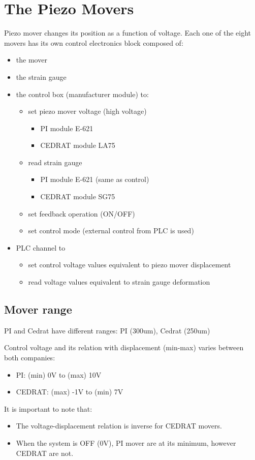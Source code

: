 \section{The Piezo Movers}
Piezo mover changes its position as a function of voltage. Each one of the eight movers has its own control electronics block composed of: 
\begin{itemize}
 \item the mover
\item the strain gauge
\item the control box (manufacturer module) to:
\begin{itemize}
 \item set piezo mover voltage (high voltage)
 \begin{itemize}
\item PI module E-621
\item CEDRAT module LA75
\end{itemize}
\item read strain gauge
\begin{itemize}
\item PI module E-621 (same as control)
\item CEDRAT module SG75
\end{itemize}
\item set feedback operation (ON/OFF)
\item set control mode (external control from PLC is used)
\end{itemize}
\item PLC channel to
\begin{itemize}
\item set control voltage values equivalent to piezo mover displacement
\item read voltage values equivalent to strain gauge deformation
\end{itemize}
\end{itemize}

\subsection{Mover range}
PI and Cedrat have different ranges: PI (300um), Cedrat (250um)\par

Control voltage and its relation with displacement (min-max) varies between both companies:\par
\begin{itemize}
\item PI: 		(min)   0V   	to 	(max) 10V
\item CEDRAT: 	(max) -1V 	to	(min)    7V
\end{itemize}
It is important to note that:
\begin{itemize}
\item The voltage-displacement relation is inverse for CEDRAT movers.
\item When the system is OFF (0V), PI mover are at its minimum, however CEDRAT are not.
\end{itemize}

